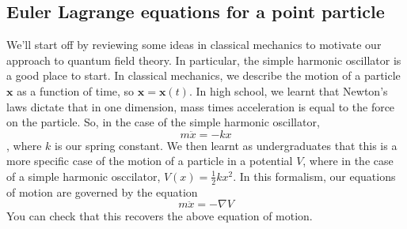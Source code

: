 \subsection {Euler Lagrange equations for a point particle}  
We'll start off by reviewing some ideas in classical mechanics to motivate our approach to quantum field theory. In particular, the simple harmonic oscillator is a good place to start. In classical mechanics, we describe the motion of a particle $ \mathbf{x}  $ as a function of time, so $\mathbf{x} = \mathbf{x}( t ) $. In high school, we learnt that Newton's laws dictate that in one dimension, mass times acceleration is equal to the force on the particle. So, in the case of the simple harmonic oscillator, \[ m \ddot{x} = - k x \], where $k$ is our spring constant. We then learnt as undergraduates that this is a more specific case of the motion of a particle in a potential $V$, where in the case of a simple harmonic osccilator, $V (x) = \frac{1}{2} k x^2 $. In this formalism, our equations of motion are governed by the equation \[ m \ddot{x} = - \nabla V \] You can check that this recovers the above equation of motion.      

